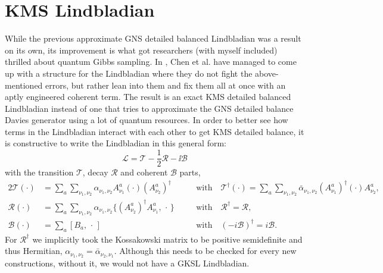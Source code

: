 \section{KMS Lindbladian} While the previous approximate GNS detailed balanced Lindbladian was a result on its own, its improvement is what got researchers (with myself included) thrilled about quantum Gibbs sampling. In \cite{chen2023efficient}, Chen et al. have managed to come up with a structure for the Lindbladian where they do not fight the above-mentioned errors, but rather lean into them and fix them all at once with an aptly engineered coherent term. The result is an exact KMS detailed balanced Lindbladian instead of one that tries to approximate the GNS detailed balance Davies generator using a lot of quantum resources. In order to better see how terms in the Lindbladian interact with each other to get KMS detailed balance, it is constructive to write the Lindbladian in this general form:
\begin{equation}
    \mathcal{L} = \mathcal{T} - \frac{1}{2}\mathcal{R} - \ii \mathcal{B}
\end{equation}
with the transition $\mathcal{T}$, decay $\mathcal{R}$ and coherent $\mathcal{B}$ parts, 
\begin{alignat}{2} \label{eq:ckg-L-parts}
\mathcal{T}(\cdot) 
  &= \sum_a\sum_{\nu_1,\nu_2} \alpha_{\nu_1,\nu_2} A^a_{\nu_1}(\cdot)(A^a_{\nu_2})^\dagger
  &\quad&\text{with}\quad
  \mathcal{T}^\dagger(\cdot) = \sum_a\sum_{\nu_1,\nu_2} \bar\alpha_{\nu_1,\nu_2}(A^a_{\nu_1})^\dagger(\cdot)A^a_{\nu_2},
  \\
\mathcal{R}(\cdot) 
  &= \sum_a\sum_{\nu_1,\nu_2} \alpha_{\nu_1,\nu_2}\{(A^a_{\nu_2})^\dagger A^a_{\nu_1},\,\cdot\,\}
  &\quad&\text{with}\quad
  \mathcal{R}^\dagger = \mathcal{R},
  \\
\mathcal{B}(\cdot) 
  &= \sum_a[B_a,\,\cdot\,]
  &\quad&\text{with}\quad
  (-i\mathcal{B})^\dagger = i\mathcal{B}.
\end{alignat}
For $\mathcal{R}^\dagger$ we implicitly took the Kossakowski matrix to be positive semidefinite and thus Hermitian, $\alpha_{\nu_1, \nu_2} = \bar\alpha_{\nu_2, \nu_1}$. Although this needs to be checked for every new constructions, without it, we would not have a GKSL Lindbladian.

